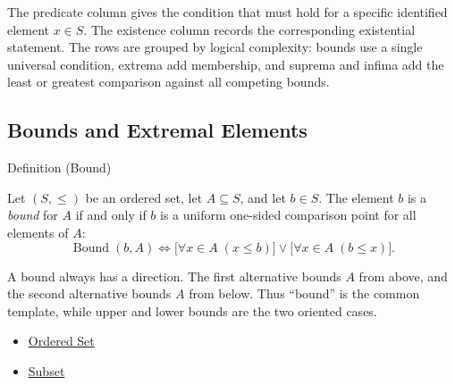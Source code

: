 \medskip

\begin{remark*}
The predicate column gives the condition that must hold for a specific
identified element $x \in S$. The existence column records the corresponding
existential statement. The rows are grouped by logical complexity: bounds use a
single universal condition, extrema add membership, and suprema and infima add
the least or greatest comparison against all competing bounds.
\end{remark*}













\subsection*{Bounds and Extremal Elements}

\begin{definitionbox}{Definition (Bound)}
\begin{definition}[Bound]
\label{def:bound}
Let $(S,\le)$ be an ordered set, let $A\subseteq S$, and let $b\in S$. The element $b$ is a \emph{bound} for $A$ if and only if $b$ is a uniform one-sided comparison point for all elements of $A$:
\[
\operatorname{Bound}(b,A)
\Longleftrightarrow
\bigl[\forall x\in A\;(x\le b)\bigr]
\lor
\bigl[\forall x\in A\;(b\le x)\bigr].
\]
\end{definition}
\end{definitionbox}

\begin{remark*}[Orientation]
A bound always has a direction. The first alternative bounds $A$ from above,
and the second alternative bounds $A$ from below. Thus ``bound'' is the common
template, while upper and lower bounds are the two oriented cases.
\end{remark*}

\begin{dependencies}
\begin{itemize}
  \item \hyperref[def:ordered-set]{Ordered Set}
  \item \hyperref[def:subset]{Subset}
\end{itemize}
\end{dependencies}

